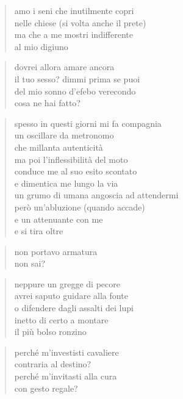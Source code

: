 	\begin{verse}
		amo i seni che inutilmente copri\\
		nelle chiese (si volta anche il prete)\\
		ma che a me mostri indifferente\\
		al mio digiuno
	\end{verse}

	\begin{verse}
		dovrei allora amare ancora\\
		il tuo sesso? dimmi prima se puoi\\
		del mio sonno d'efebo verecondo\\
		cosa ne hai fatto?
	\end{verse}

\clearpage


	\begin{verse}
		spesso in questi giorni mi fa compagnia\\
		un oscillare da metronomo\\
		che millanta autenticità\\
		ma poi l'inflessibilità del moto\\
		conduce me al suo esito scontato\\
		e dimentica me lungo la via\\
		un grumo di umana angoscia ad attendermi\\
		però un'abluzione (quando accade)\\
		e un attenuante con me\\
		e si tira oltre
	\end{verse}

\clearpage


	\begin{verse}
		non portavo armatura\\
		non sai?
	\end{verse}

	\begin{verse}
		neppure un gregge di pecore\\
		avrei saputo guidare alla fonte\\
		o difendere dagli assalti dei lupi\\
		inetto di certo a montare\\
		il più bolso ronzino
	\end{verse}

	\begin{verse}
		perché m'investisti cavaliere\\
		contraria al destino?\\
		perché m'invitasti alla cura\\
		con gesto regale?
	\end{verse}

